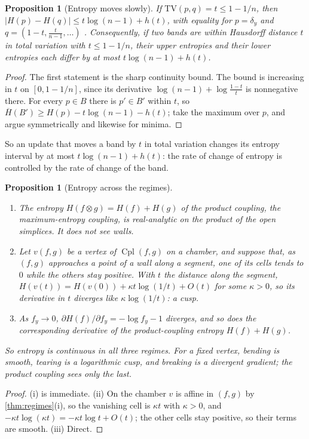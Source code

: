 \documentclass[11pt]{article}
\newtheorem{proposition}[theorem]{Proposition}
\theoremstyle{definition}
\theoremstyle{remark}
\newcommand{\Cpl}{\operatorname{Cpl}}
\newcommand{\TV}{\mathrm{TV}}
\newcommand{\Hup}{\overline{H}}
\begin{document}
\begin{proposition}[Entropy moves slowly]\label{prop:entropyspeed}
If $\TV(p,q)=t\le1-1/n$, then $\lvert H(p)-H(q)\rvert\le t\log(n-1)+h(t)$, with equality for $p=\delta_y$ and
$q=(1-t,\frac t{n-1},\dots)$ \cite{Zhang2007,Audenaert2007}. Consequently, if two bands are within Hausdorff distance $t$ in total
variation with $t\le1-1/n$, their upper entropies and their lower entropies each differ by at most $t\log(n-1)+h(t)$.
\end{proposition}
\begin{proof}
The first statement is the sharp continuity bound. The bound is increasing in $t$ on $[0,1-1/n]$, since its derivative
$\log(n-1)+\log\frac{1-t}t$ is nonnegative there. For every $p\in B$ there is $p'\in B'$ within $t$, so
$\Hup(B')\ge H(p)-t\log(n-1)-h(t)$; take the maximum over $p$, and argue symmetrically and likewise for minima.
\end{proof}

So an update that moves a band by $t$ in total variation changes its entropy interval by at most $t\log(n-1)+h(t)$: the rate of
change of entropy is controlled by the rate of change of the band.

\begin{proposition}[Entropy across the regimes]\label{prop:entropyregimes}
\begin{enumerate}[label=(\roman*)]
\item The entropy $H(f\otimes g)=H(f)+H(g)$ of the product coupling, the maximum-entropy coupling, is real-analytic on the
  product of the open simplices. It does not see walls.
\item Let $v(f,g)$ be a vertex of $\Cpl(f,g)$ on a chamber, and suppose that, as $(f,g)$ approaches a point of a wall along a
  segment, one of its cells tends to $0$ while the others stay positive. With $t$ the distance along the segment,
  $H(v(t))=H(v(0))+\kappa t\log(1/t)+O(t)$ for some $\kappa>0$, so its derivative in $t$ diverges like $\kappa\log(1/t)$: a cusp.
\item As $f_y\to0$, $\partial H(f)/\partial f_y=-\log f_y-1$ diverges, and so does the corresponding derivative of the
  product-coupling entropy $H(f)+H(g)$.
\end{enumerate}
So entropy is continuous in all three regimes. For a fixed vertex, bending is smooth, tearing is a logarithmic cusp, and
breaking is a divergent gradient; the product coupling sees only the last.
\end{proposition}
\begin{proof}
(i) is immediate. (ii) On the chamber $v$ is affine in $(f,g)$ by \cref{thm:regimes}(i), so the vanishing cell is $\kappa t$ with
$\kappa>0$, and $-\kappa t\log(\kappa t)=-\kappa t\log t+O(t)$; the other cells stay positive, so their terms are smooth. (iii)
Direct.
\end{proof}
\end{document}

